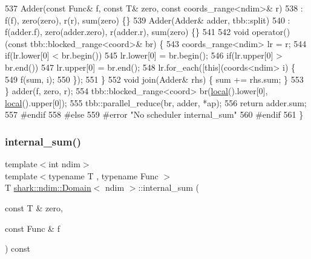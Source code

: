 \begin{DoxyCode}
537                 Adder(\textcolor{keyword}{const} Func& f, \textcolor{keyword}{const} T& zero, \textcolor{keyword}{const} coords\_range<ndim>& r) 
538                     : f(f), zero(zero), r(r), sum(zero) \{\}
539                 Adder(Adder& adder, tbb::split)
540                     : f(adder.f), zero(adder.zero), r(adder.r), sum(zero) \{\}
541 
542                 \textcolor{keywordtype}{void} operator()(\textcolor{keyword}{const} tbb::blocked\_range<coord>& br) \{
543                     coords\_range<ndim> lr = r;
544                     \textcolor{keywordflow}{if}(lr.lower[0] < br.begin())
545                         lr.lower[0] = br.begin();
546                     \textcolor{keywordflow}{if}(lr.upper[0] > br.end())
547                         lr.upper[0] = br.end();
548                     lr.for\_each([\textcolor{keyword}{this}](coords<ndim> i) \{
549                         f(sum, i);
550                     \});
551                 \}
552                 \textcolor{keywordtype}{void} join(Adder& rhs) \{ sum += rhs.sum; \}
553             \} adder(f, zero, r);
554             tbb::blocked\_range<coord> br(\hyperlink{classshark_1_1ndim_1_1_domain_a3351db56f9d6bd22ba473d744e3f7025}{local}().lower[0], \hyperlink{classshark_1_1ndim_1_1_domain_a3351db56f9d6bd22ba473d744e3f7025}{local}().upper[0]);
555             tbb::parallel\_reduce(br, adder, *ap);
556             \textcolor{keywordflow}{return} adder.sum;
557 \textcolor{preprocessor}{#endif}
558 \textcolor{preprocessor}{#else}
559 \textcolor{preprocessor}{#error "No scheduler internal\_sum"}
560 \textcolor{preprocessor}{#endif}
561         \}
\end{DoxyCode}
\hypertarget{classshark_1_1ndim_1_1_domain_ad20744022f33cbcb5bd0af12d82cf7c7}{}\label{classshark_1_1ndim_1_1_domain_ad20744022f33cbcb5bd0af12d82cf7c7} 
\subsubsection{\texorpdfstring{internal\+\_\+sum()}{internal\_sum()}\hspace{0.1cm}{\footnotesize\ttfamily [3/3]}}
{\footnotesize\ttfamily template$<$int ndim$>$ \\
template$<$typename T , typename Func $>$ \\
T \hyperlink{classshark_1_1ndim_1_1_domain}{shark\+::ndim\+::\+Domain}$<$ ndim $>$\+::internal\+\_\+sum (\begin{DoxyParamCaption}\item[{const T \&}]{zero,  }\item[{const Func \&}]{f }\end{DoxyParamCaption}) const\hspace{0.3cm}{\ttfamily [inline]}}



